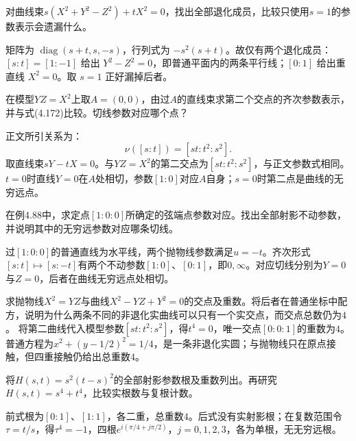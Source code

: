 对曲线束\(s(X^2+Y^2-Z^2)+tX^2=0\)，找出全部退化成员，比较只使用\(s=1\)的参数表示会遗漏什么。
\par
\solutionanswer
矩阵为 \(\operatorname{diag}(s+t,s,-s)\)，行列式为 \(-s^2(s+t)\)。故仅有两个退化成员：\([s:t]=[1:-1]\) 给出 \(Y^2-Z^2=0\)，即普通平面内的两条平行线；\([0:1]\) 给出重直线 \(X^2=0\)。取 \(s=1\) 正好漏掉后者。


在模型\(YZ=X^2\)上取\(A=(0,0)\)，由过\(A\)的直线束求第二个交点的齐次参数表示，并与式\textup{(4.172)}比较。切线参数对应哪个点？
\par

\par\smallskip\noindent 正文所引关系为：
\begin{equation*}
\nu([s:t])=[st:t^2:s^2].
\end{equation*}
\solutionanswer
取直线束\(sY-tX=0\)。与\(YZ=X^2\)的第二交点为\([st:t^2:s^2]\)，与正文参数式相同。\(t=0\)时直线\(Y=0\)在\(A\)处相切，参数\([1:0]\)对应\(A\)自身；\(s=0\)时第二点是曲线的无穷远点。


在例4.88中，求定点\([1:0:0]\)所确定的弦端点参数对应。找出全部射影不动参数，并说明其中的无穷远参数对应哪条切线。
\par
\solutionanswer
过\([1:0:0]\)的普通直线为水平线，两个抛物线参数满足\(u=-t\)。齐次形式\([s:t]\mapsto[s:-t]\)有两个不动参数\([1:0]\)、\([0:1]\)，即\(0,\infty\)。对应切线分别为\(Y=0\)与\(Z=0\)，后者在曲线无穷远点处相切。


求抛物线\(X^2=YZ\)与曲线\(X^2-YZ+Y^2=0\)的交点及重数。将后者在普通坐标中配方，说明为什么两条不同的非退化实曲线可以只有一个实交点，而交点总数仍为\(4\)。
\solutionanswer
将第二曲线代入模型参数\([st:t^2:s^2]\)，得\(t^4=0\)，唯一交点\([0:0:1]\)的重数为\(4\)。普通方程为\(x^2+(y-1/2)^2=1/4\)，是一条非退化实圆；与抛物线只在原点接触，但四重接触仍给出总重数\(4\)。


将\(H(s,t)=s^2(t-s)^2\)的全部射影参数根及重数列出。再研究\(H(s,t)=s^4+t^4\)，比较实根数与复根计数。
\par
\solutionanswer
前式根为\([0:1]\)、\([1:1]\)，各二重，总重数\(4\)。后式没有实射影根；在复数范围令\(\tau=t/s\)，得\(\tau^4=-1\)，四根\(e^{i(\pi/4+j\pi/2)}\)，\(j=0,1,2,3\)，各为单根，无无穷远根。


